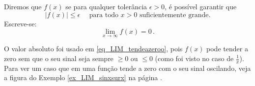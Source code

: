 \begin{defin}\label{defin_tender_a_zero}
Diremos que $f(x)$ 
se para qualquer tolerância $\epsilon>0$, é possível garantir que 
\begin{equation}\label{eq_LIM_tendeazeroo}
|f(x)|\leq \epsilon\quad \text{ para todo $x>0$ suficientemente grande.} 
\end{equation}
Escreve-se:
\[ 
\lim_{x\to\infty}f(x)=0\,.
\]
\end{defin}
O valor absoluto foi usado em
\eqref{eq_LIM_tendeazeroo}, pois $f(x)$ pode tender a zero sem que o
seu sinal seja sempre $\geq 0$ ou $\leq 0$ (como foi visto no caso de
$\tfrac1x$).
Para ver um caso que em uma função tende a zero com o seu sinal
oscilando, veja a figura do 
Exemplo \ref{ex_LIM_sinxsurx} na página \pageref{ex_LIM_sinxsurx}.

